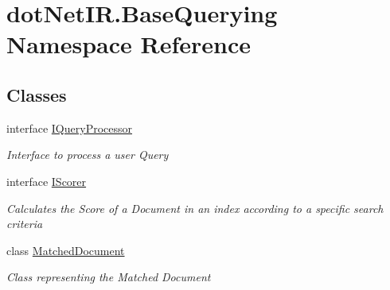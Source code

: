 \hypertarget{namespacedot_net_i_r_1_1_base_querying}{}\section{dot\+Net\+I\+R.\+Base\+Querying Namespace Reference}
\label{namespacedot_net_i_r_1_1_base_querying}
\subsection*{Classes}
\begin{DoxyCompactItemize}
\item 
interface \hyperlink{interfacedot_net_i_r_1_1_base_querying_1_1_i_query_processor}{I\+Query\+Processor}
\begin{DoxyCompactList}\small\item\em Interface to process a user Query \end{DoxyCompactList}\item 
interface \hyperlink{interfacedot_net_i_r_1_1_base_querying_1_1_i_scorer}{I\+Scorer}
\begin{DoxyCompactList}\small\item\em Calculates the Score of a Document in an index according to a specific search criteria \end{DoxyCompactList}\item 
class \hyperlink{classdot_net_i_r_1_1_base_querying_1_1_matched_document}{Matched\+Document}
\begin{DoxyCompactList}\small\item\em Class representing the Matched Document \end{DoxyCompactList}\end{DoxyCompactItemize}

